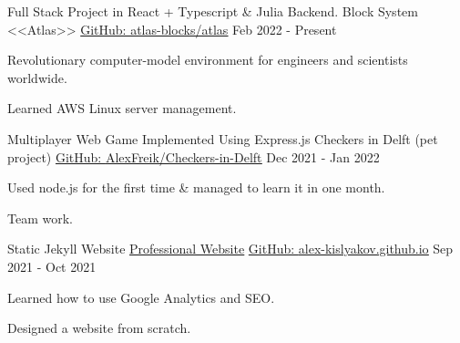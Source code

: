
\newcommand{\gitHref}[1]{\href{https://github.com/#1}{GitHub: \underline{#1}}}
\newcommand{\myHref}[2]{\href{#1}{\underline{#2}}}

\begin{cventries}

  \cventry
    {Full Stack Project in React + Typescript \& Julia Backend.}
    {Block System <<Atlas>>} 
    {\gitHref{atlas-blocks/atlas}} %
    {Feb 2022 - Present} %
    {
      \begin{cvitems} %
        \item {Revolutionary computer-model environment for engineers and scientists worldwide.}
        \item {Learned AWS Linux server management.}
      \end{cvitems}
    }

  \cventry
    {Multiplayer Web Game Implemented Using Express.js}
    {Checkers in Delft (pet project)} 
    {\gitHref{AlexFreik/Checkers-in-Delft}} %
    {Dec 2021 - Jan 2022} %
    {
      \begin{cvitems} %
        \item {Used node.js for the first time \& managed to learn it in one month.}
        \item {Team work.}
      \end{cvitems}
    }

  \cventry
    {Static Jekyll Website}
    {\href{https://aleksnlp.com/}{\underline{Professional Website}}} 
    {\gitHref{alex-kislyakov.github.io}} %
    {Sep 2021 - Oct 2021} %
    {
      \begin{cvitems} %
        \item {Learned how to use Google Analytics and SEO.}
        \item {Designed a website from scratch.}
      \end{cvitems}
    }


\end{cventries}
